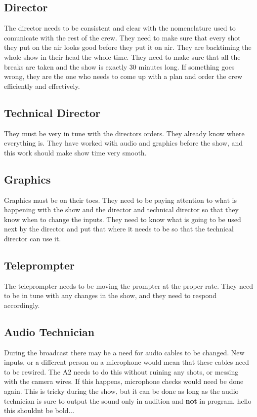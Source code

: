 \documentclass[letterpaper,10pt,oneside]{article}
\begin{document}
\subsection{Director}
The director needs to be consistent and clear with the nomenclature used to comunicate with the rest of the crew. They need to make sure that every shot they put on the air looks good before they put it on air. They are backtiming the whole show in their head the whole time. They need to make sure that all the breaks are taken and the show is exactly 30 minutes long. If something goes wrong, they are the one who needs to come up with a plan and order the crew efficiently and effectively.

\subsection{Technical Director}
They must be very in tune with the directors orders. They already know where everything is. They have worked with audio and graphics before the show, and this work should make show time very smooth.

\subsection{Graphics}
Graphics must be on their toes. They need to be paying attention to what is happening with the show and the director and technical director so that they know when to change the inputs. They need to know what is going to be used next by the director and put that where it needs to be so that the technical director can use it.

\subsection{Teleprompter}
The teleprompter needs to be moving the prompter at the proper rate. They need to be in tune with any changes in the show, and they need to respond accordingly.

\subsection{Audio Technician}
During the broadcast there may be a need for audio cables to be changed. New inputs, or a different person on a microphone would mean that these cables need to be rewired. The A2 needs to do this without ruining any shots, or messing with the camera wires. If this happens, microphone checks would need be done again. This is tricky during the show, but it can be done as long as the audio technician is sure to output the sound only in audition and \textbf{not} in program. hello this shouldnt be bold...
\end{document}
